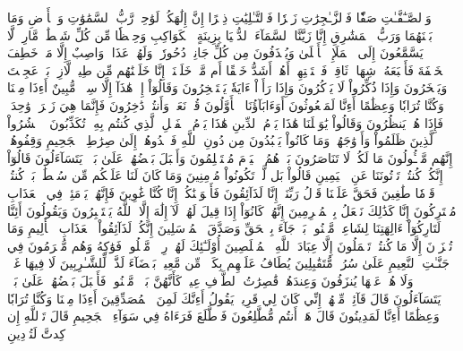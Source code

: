 وَٱلصَّـٰٓفَّـٰتِ صَفّٗا
فَٱلزَّـٰجِرَٰتِ زَجۡرٗا
فَٱلتَّـٰلِيَٰتِ ذِكۡرًا
إِنَّ إِلَٰهَكُمۡ لَوَٰحِدٞ
رَّبُّ ٱلسَّمَٰوَٰتِ وَٱلۡأَرۡضِ وَمَا بَيۡنَهُمَا وَرَبُّ ٱلۡمَشَٰرِقِ
إِنَّا زَيَّنَّا ٱلسَّمَآءَ ٱلدُّنۡيَا بِزِينَةٍ ٱلۡكَوَاكِبِ
وَحِفۡظٗا مِّن كُلِّ شَيۡطَٰنٖ مَّارِدٖ
لَّا يَسَّمَّعُونَ إِلَى ٱلۡمَلَإِ ٱلۡأَعۡلَىٰ وَيُقۡذَفُونَ مِن كُلِّ جَانِبٖ
دُحُورٗاۖ وَلَهُمۡ عَذَابٞ وَاصِبٌ
إِلَّا مَنۡ خَطِفَ ٱلۡخَطۡفَةَ فَأَتۡبَعَهُۥ شِهَابٞ ثَاقِبٞ
فَٱسۡتَفۡتِهِمۡ أَهُمۡ أَشَدُّ خَلۡقًا أَم مَّنۡ خَلَقۡنَآۚ إِنَّا خَلَقۡنَٰهُم مِّن طِينٖ لَّازِبِۭ
بَلۡ عَجِبۡتَ وَيَسۡخَرُونَ
وَإِذَا ذُكِّرُواْ لَا يَذۡكُرُونَ
وَإِذَا رَأَوۡاْ ءَايَةٗ يَسۡتَسۡخِرُونَ
وَقَالُوٓاْ إِنۡ هَٰذَآ إِلَّا سِحۡرٞ مُّبِينٌ
أَءِذَا مِتۡنَا وَكُنَّا تُرَابٗا وَعِظَٰمًا أَءِنَّا لَمَبۡعُوثُونَ
أَوَءَابَآؤُنَا ٱلۡأَوَّلُونَ
قُلۡ نَعَمۡ وَأَنتُمۡ دَٰخِرُونَ
فَإِنَّمَا هِيَ زَجۡرَةٞ وَٰحِدَةٞ فَإِذَا هُمۡ يَنظُرُونَ
وَقَالُواْ يَٰوَيۡلَنَا هَٰذَا يَوۡمُ ٱلدِّينِ
هَٰذَا يَوۡمُ ٱلۡفَصۡلِ ٱلَّذِي كُنتُم بِهِۦ تُكَذِّبُونَ
۞ٱحۡشُرُواْ ٱلَّذِينَ ظَلَمُواْ وَأَزۡوَٰجَهُمۡ وَمَا كَانُواْ يَعۡبُدُونَ
مِن دُونِ ٱللَّهِ فَٱهۡدُوهُمۡ إِلَىٰ صِرَٰطِ ٱلۡجَحِيمِ
وَقِفُوهُمۡۖ إِنَّهُم مَّسۡـُٔولُونَ
مَا لَكُمۡ لَا تَنَاصَرُونَ
بَلۡ هُمُ ٱلۡيَوۡمَ مُسۡتَسۡلِمُونَ
وَأَقۡبَلَ بَعۡضُهُمۡ عَلَىٰ بَعۡضٖ يَتَسَآءَلُونَ
قَالُوٓاْ إِنَّكُمۡ كُنتُمۡ تَأۡتُونَنَا عَنِ ٱلۡيَمِينِ
قَالُواْ بَل لَّمۡ تَكُونُواْ مُؤۡمِنِينَ
وَمَا كَانَ لَنَا عَلَيۡكُم مِّن سُلۡطَٰنِۭۖ بَلۡ كُنتُمۡ قَوۡمٗا طَٰغِينَ
فَحَقَّ عَلَيۡنَا قَوۡلُ رَبِّنَآۖ إِنَّا لَذَآئِقُونَ
فَأَغۡوَيۡنَٰكُمۡ إِنَّا كُنَّا غَٰوِينَ
فَإِنَّهُمۡ يَوۡمَئِذٖ فِي ٱلۡعَذَابِ مُشۡتَرِكُونَ
إِنَّا كَذَٰلِكَ نَفۡعَلُ بِٱلۡمُجۡرِمِينَ
إِنَّهُمۡ كَانُوٓاْ إِذَا قِيلَ لَهُمۡ لَآ إِلَٰهَ إِلَّا ٱللَّهُ يَسۡتَكۡبِرُونَ
وَيَقُولُونَ أَئِنَّا لَتَارِكُوٓاْ ءَالِهَتِنَا لِشَاعِرٖ مَّجۡنُونِۭ
بَلۡ جَآءَ بِٱلۡحَقِّ وَصَدَّقَ ٱلۡمُرۡسَلِينَ
إِنَّكُمۡ لَذَآئِقُواْ ٱلۡعَذَابِ ٱلۡأَلِيمِ
وَمَا تُجۡزَوۡنَ إِلَّا مَا كُنتُمۡ تَعۡمَلُونَ
إِلَّا عِبَادَ ٱللَّهِ ٱلۡمُخۡلَصِينَ
أُوْلَـٰٓئِكَ لَهُمۡ رِزۡقٞ مَّعۡلُومٞ
فَوَٰكِهُ وَهُم مُّكۡرَمُونَ
فِي جَنَّـٰتِ ٱلنَّعِيمِ
عَلَىٰ سُرُرٖ مُّتَقَٰبِلِينَ
يُطَافُ عَلَيۡهِم بِكَأۡسٖ مِّن مَّعِينِۭ
بَيۡضَآءَ لَذَّةٖ لِّلشَّـٰرِبِينَ
لَا فِيهَا غَوۡلٞ وَلَا هُمۡ عَنۡهَا يُنزَفُونَ
وَعِندَهُمۡ قَٰصِرَٰتُ ٱلطَّرۡفِ عِينٞ
كَأَنَّهُنَّ بَيۡضٞ مَّكۡنُونٞ
فَأَقۡبَلَ بَعۡضُهُمۡ عَلَىٰ بَعۡضٖ يَتَسَآءَلُونَ
قَالَ قَآئِلٞ مِّنۡهُمۡ إِنِّي كَانَ لِي قَرِينٞ
يَقُولُ أَءِنَّكَ لَمِنَ ٱلۡمُصَدِّقِينَ
أَءِذَا مِتۡنَا وَكُنَّا تُرَابٗا وَعِظَٰمًا أَءِنَّا لَمَدِينُونَ
قَالَ هَلۡ أَنتُم مُّطَّلِعُونَ
فَٱطَّلَعَ فَرَءَاهُ فِي سَوَآءِ ٱلۡجَحِيمِ
قَالَ تَٱللَّهِ إِن كِدتَّ لَتُرۡدِينِ
